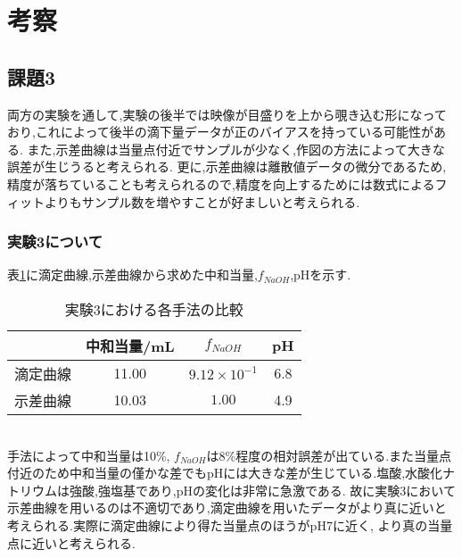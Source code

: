 \section{考察}
\subsection{課題3}
両方の実験を通して,実験の後半では映像が目盛りを上から覗き込む形になっており,これによって後半の滴下量データが正のバイアスを持っている可能性がある.
また,示差曲線は当量点付近でサンプルが少なく,作図の方法によって大きな誤差が生じうると考えられる.
更に,示差曲線は離散値データの微分であるため,精度が落ちていることも考えられるので,精度を向上するためには数式によるフィットよりもサンプル数を増やすことが好ましいと考えられる.
\subsubsection{実験3について}
表\ref{tab:hikaku1}に滴定曲線,示差曲線から求めた中和当量,$f_{NaOH}$,pHを示す.
\begin{table}[htbp]
   \caption{実験3における各手法の比較}
   \label{tab:hikaku1}
   \centering
   \begin{tabular}{lccc}
     \hline
     &中和当量/\si{\milli L}&$f_{NaOH}$&pH\\
     \hline \hline
     滴定曲線&11.00&$9.12\times10^{-1}$&6.8\\
     示差曲線&10.03&$1.00$&4.9\\
     \hline
   \end{tabular}
\end{table}\\
手法によって中和当量は10\%, $f_{NaOH}$は8\%程度の相対誤差が出ている.また当量点付近のため中和当量の僅かな差でもpHには大きな差が生じている.塩酸,水酸化ナトリウムは強酸,強塩基であり,pHの変化は非常に急激である.
故に実験3において示差曲線を用いるのは不適切であり,滴定曲線を用いたデータがより真に近いと考えられる.実際に滴定曲線により得た当量点のほうがpH7に近く,
より真の当量点に近いと考えられる.
